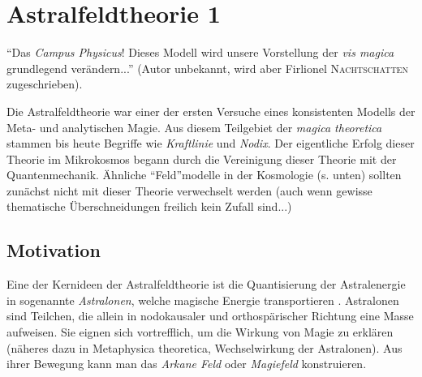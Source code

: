 \chapter[tocentry=Astralfeldtheorie, head=Astralfeldtheorie]{Astralfeldtheorie 1}
"`Das \emph{Campus Physicus}! Dieses Modell wird unsere Vorstellung der \emph{vis magica} grundlegend verändern..."' (Autor unbekannt, wird aber Firlionel \textsc{Nachtschatten} zugeschrieben).

Die Astralfeldtheorie war einer der ersten Versuche eines konsistenten Modells der Meta- und analytischen Magie. Aus diesem Teilgebiet der \emph{magica theoretica} stammen bis heute Begriffe wie \emph{Kraftlinie} und \emph{Nodix}. Der eigentliche Erfolg dieser Theorie im Mikrokosmos begann durch die Vereinigung dieser Theorie mit der Quantenmechanik.  Ähnliche "`Feld"'modelle in der Kosmologie (s. unten) sollten zunächst nicht mit dieser Theorie verwechselt werden (auch wenn gewisse thematische Überschneidungen freilich kein Zufall sind...)

\section{Motivation}
Eine der Kernideen der Astralfeldtheorie ist die Quantisierung der Astralenergie in sogenannte \emph{Astralonen}, welche magische Energie transportieren \cite{quanten}. Astralonen sind Teilchen, die allein in nodokausaler und orthospärischer Richtung eine Masse aufweisen. Sie eignen sich vortrefflich, um die Wirkung von Magie zu erklären (näheres dazu in Metaphysica theoretica, Wechselwirkung der Astralonen). Aus ihrer Bewegung kann man das \emph{Arkane Feld} oder \emph{Magiefeld} konstruieren.

